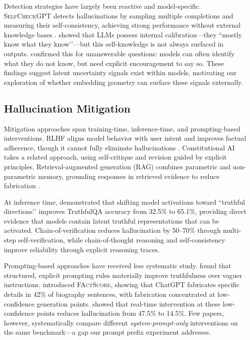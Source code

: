 \documentclass{article}
\begin{document}
Detection strategies have largely been reactive and model-specific. \textsc{SelfCheckGPT} detects hallucinations by sampling multiple completions and measuring their self-consistency, achieving strong performance without external knowledge bases \citep{manakul2023selfcheckgpt}. \citet{kadavath2022language} showed that LLMs possess internal calibration---they ``mostly know what they know’’---but this self-knowledge is not always surfaced in outputs. \citet{yin2023large} confirmed this for unanswerable questions: models can often identify what they do not know, but need explicit encouragement to say so. These findings suggest latent uncertainty signals exist within models, motivating our exploration of whether embedding geometry can surface these signals externally.

\subsection{Hallucination Mitigation}

Mitigation approaches span training-time, inference-time, and prompting-based interventions. RLHF aligns model behavior with user intent and improves factual adherence, though it cannot fully eliminate hallucinations \citep{ouyang2022training}. Constitutional AI \citep{bai2022constitutional} takes a related approach, using self-critique and revision guided by explicit principles. Retrieval-augmented generation (RAG) combines parametric and non-parametric memory, grounding responses in retrieved evidence to reduce fabrication \citep{lewis2020rag}.

At inference time, \citet{li2024inferencetime} demonstrated that shifting model activations toward ``truthful directions’’ improves TruthfulQA accuracy from 32.5\% to 65.1\%, providing direct evidence that models contain latent truthful representations that can be activated. Chain-of-verification \citep{dhuliawala2023chainofverification} reduces hallucination by 50--70\% through multi-step self-verification, while chain-of-thought reasoning \citep{wei2022chainofthought} and self-consistency \citep{wang2023selfconsistency} improve reliability through explicit reasoning traces.

Prompting-based approaches have received less systematic study. \citet{arora2024structured} found that structured, explicit prompting rules materially improve truthfulness over vaguer instructions. \citet{min2023factscore} introduced \textsc{FActScore}, showing that ChatGPT fabricates specific details in 42\% of biography sentences, with fabrication concentrated at low-confidence generation points. \citet{varshney2023stitch} showed that real-time intervention at these low-confidence points reduces hallucination from 47.5\% to 14.5\%. Few papers, however, systematically compare different \emph{system-prompt-only} interventions on the same benchmark---a gap our prompt prefix experiment addresses.
\end{document}
